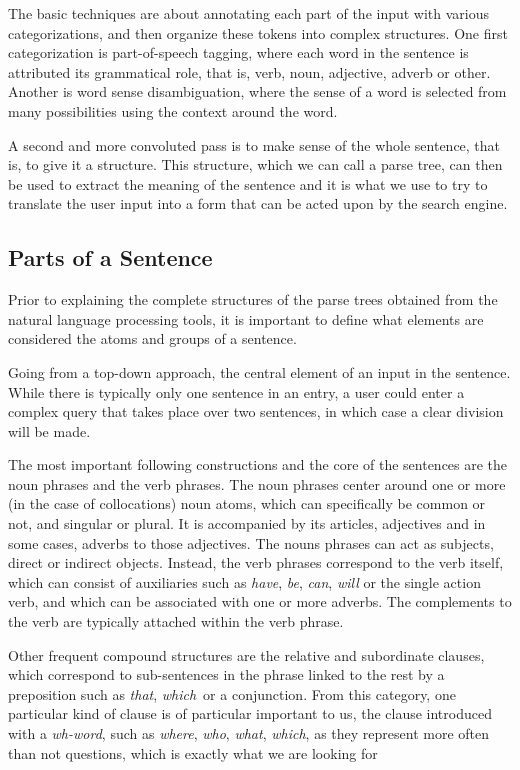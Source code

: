 The basic techniques are about annotating each part of the input with various categorizations, and then organize these tokens into complex structures. One first categorization is part-of-speech tagging, where each word in the sentence is attributed its grammatical role, that is, verb, noun, adjective, adverb or other. Another is word sense disambiguation, where the sense of a word is selected from many possibilities using the context around the word.

A second and more convoluted pass is to make sense of the whole sentence, that is, to give it a structure. This structure, which we can call a parse tree, can then be used to extract the meaning of the sentence and it is what we use to try to translate the user input into a form that can be acted upon by the search engine.


\subsection{Parts of a Sentence} %
\label{sub:parts_of_a_sentence}

Prior to explaining the complete structures of the parse trees obtained from the natural language processing tools, it is important to define what elements are considered the atoms and groups of a sentence.

Going from a top-down approach, the central element of an input in the sentence. While there is typically only one sentence in an entry, a user could enter a complex query that takes place over two sentences, in which case a clear division will be made.

The most important following constructions and the core of the sentences are the noun phrases and the verb phrases. The noun phrases center around one or more (in the case of collocations) noun atoms, which can specifically be common or not, and singular or plural. It is accompanied by its articles, adjectives and in some cases, adverbs to those adjectives. The nouns phrases can act as subjects, direct or indirect objects. Instead, the verb phrases correspond to the verb itself, which can consist of auxiliaries such as \emph{have}, \emph{be}, \emph{can}, \emph{will} or the single action verb, and which can be associated with one or more adverbs. The complements to the verb are typically attached within the verb phrase.

Other frequent compound structures are the relative and subordinate clauses, which correspond to sub-sentences in the phrase linked to the rest by a preposition such as \emph{that}, \emph{which}\ or a conjunction. From this category, one particular kind of clause is of particular important to us, the clause introduced with a \emph{wh-word}, such as \emph{where}, \emph{who}, \emph{what}, \emph{which}, as they represent more often than not questions, which is exactly what we are looking for

